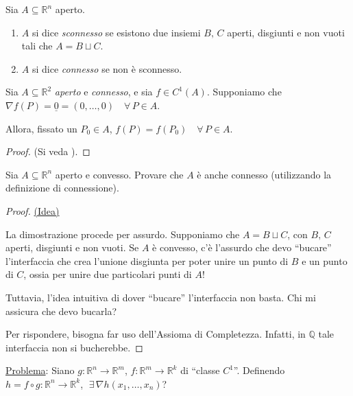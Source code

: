 \begin{definition}
Sia $A \subseteq \mathbb{R}^n$ aperto.
\begin{enumerate}[labelindent=\parindent,leftmargin=*,label=\textnormal{(\roman*)},start=1]
\item $A$ si dice \emph{sconnesso} se esistono due insiemi $B,\,C$ aperti, disgiunti e non vuoti tali che $A = B \sqcup C$.
\item $A$ si dice \emph{connesso} se non è sconnesso.
\end{enumerate}
\end{definition}

\begin{cor}
Sia $A \subseteq \mathbb{R}^2$ \emph{aperto} e \emph{connesso}, e sia $f \in C^1(A)$. Supponiamo che $\nabla f(P) = \underline{0} = (0,\ldots,0) \quad \forall \, P \in A$.

Allora, fissato un $P_0 \in A$, $f(P)=f(P_0) \quad \forall \, P \in A$.
\end{cor}
\begin{proof}
(Si veda \cite{Giusti2003}).
\end{proof}

\begin{exer}
Sia $A \subseteq \mathbb{R}^n$ aperto e convesso. Provare che $A$ è anche connesso (utilizzando la definizione di connessione).
\end{exer}
\begin{proof}
\underline{(Idea)}

La dimostrazione procede per assurdo. Supponiamo che $A = B \sqcup C$, con $B,\,C$ aperti, disgiunti e non vuoti. Se $A$ è convesso, c'è l'assurdo che devo ``bucare'' l'interfaccia che crea l'unione disgiunta per poter unire un punto di $B$ e un punto di $C$, ossia per unire due particolari punti di $A$!

\begin{center}
\def\svgwidth{8cm}

\end{center}

Tuttavia, l'idea intuitiva di dover ``bucare'' l'interfaccia non basta. Chi mi assicura che devo bucarla?

Per rispondere, bisogna far uso dell'Assioma di Completezza. Infatti, in $\mathbb{Q}$ tale interfaccia non si bucherebbe.
\end{proof}


\underline{Problema}: Siano $g: \mathbb{R}^n \longrightarrow \mathbb{R}^m$, $f: \mathbb{R}^m \longrightarrow \mathbb{R}^k$ di ``classe $C^1$''. Definendo $h = f \circ g : \mathbb{R}^n \longrightarrow \mathbb{R}^k$, $\; \exists\,  \nabla h(x_1,\ldots,x_n)$?


